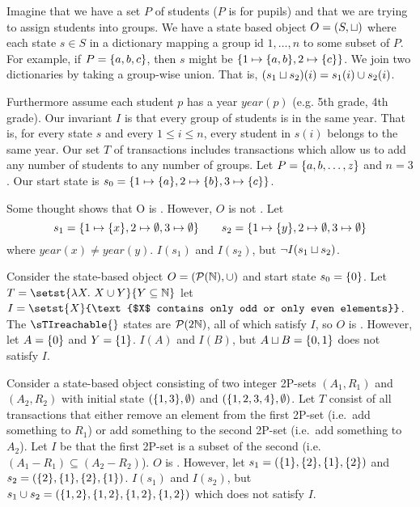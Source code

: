 \begin{example}
  Imagine that we have a set $P$ of students ($P$ is for pupils) and that we
  are trying to assign students into groups. We have a state based object $O =
  (S, \sqcup)$ where each state $s \in S$ in a dictionary mapping a group id $1,
  \ldots, n$ to some subset of $P$. For example, if $P = \{a, b, c\}$, then
  $s$ might be $\{1 \mapsto \{a, b\}, 2 \mapsto \{c\}\}$. We join two
  dictionaries by taking a group-wise union. That is, $(s_1 \sqcup s_2)(i) =
  s_1(i) \cup s_2(i)$.

  Furthermore assume each student $p$ has a year $year(p)$ (e.g. 5th grade, 4th
  grade). Our invariant $I$ is that every group of students is in the same
  year. That is, for every state $s$ and every $1 \leq i \leq n$, every student
  in $s(i)$ belongs to the same year.
  Our set $T$ of transactions includes transactions which allow us to add any
  number of students to any number of groups.
  Let $P = \{a, b, \ldots, z\}$ and $n = 3$. Our start state is $s_0 = \{1
  \mapsto \{a\}, 2 \mapsto \{b\}, 3 \mapsto \{c\}\}$.

  Some thought shows that O is \sTIconfluent{}. However, $O$ is not \Iclosed{}.
  Let
  \[
    s_1 = \{1 \mapsto \{x\}, 2 \mapsto \emptyset, 3 \mapsto \emptyset\}
    \qquad
    s_2 = \{1 \mapsto \{y\}, 2 \mapsto \emptyset, 3 \mapsto \emptyset\}
  \]
  where $year(x) \neq year(y)$. $I(s_1)$ and $I(s_2)$, but $\lnot I(s_1 \sqcup
  s_2)$.
\end{example}

\begin{example}
  Consider the state-based object $O = (\mathcal{P}(\mathbb{N}), \cup)$ and start
  state $s_0 = \{0\}$. Let $T = \setst{\lambda X.\ X \cup Y}{Y \subseteq
  \nats}$ let $I = \setst{X}{\text{$X$ contains only odd or only even
  elements}}$. The $\sTIreachable{}$ states are $\mathcal{P}(2\mathbb{N})$, all of
  which satisfy $I$, so $O$ is \sTIconfluent{}.  However, let $A = \{0\}$ and
  $Y = \{1\}$. $I(A)$ and $I(B)$, but $A \sqcup B = \{0, 1\}$ does not
  satisfy $I$.
\end{example}

\begin{example}
  Consider a state-based object consisting of two integer 2P-sets $(A_1, R_1)$
  and $(A_2, R_2)$ with initial state $(\{1, 3\}, \emptyset{})$ and $(\{1,
  2, 3, 4\}, \emptyset{})$. Let $T$ consist of all transactions that either
  remove an element from the first 2P-set (i.e.\ add something to $R_1$) or add
  something to the second 2P-set (i.e.\ add something to $A_2$). Let $I$ be
  that the first 2P-set is a subset of the second (i.e. $(A_1 - R_1) \subseteq
  (A_2 - R_2)$).
  $O$ is \sTIconfluent{}. However, let $s_1 = (\{1\}, \{2\}, \{1\},
  \{2\})$ and $s_2 = (\{2\}, \{1\}, \{2\}, \{1\})$. $I(s_1)$ and
  $I(s_2)$, but $s_1 \cup s_2 = (\{1, 2\}, \{1, 2\}, \{1, 2\}, \{1,
  2\})$ which does not satisfy $I$.
\end{example}


